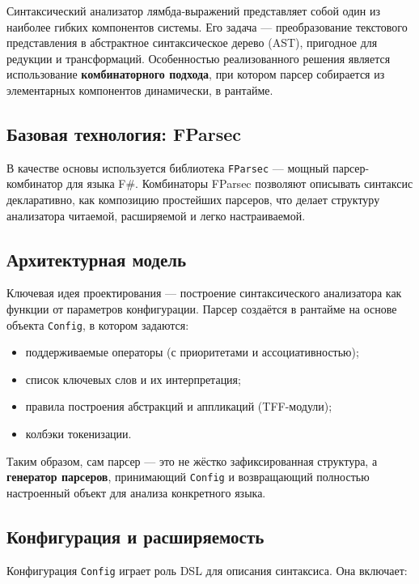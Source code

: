 Синтаксический анализатор лямбда‑выражений представляет собой один из наиболее гибких компонентов системы. Его задача — преобразование текстового представления в абстрактное синтаксическое дерево (AST), пригодное для редукции и трансформаций. Особенностью реализованного решения является использование \textbf{комбинаторного подхода}, при котором парсер собирается из элементарных компонентов динамически, в рантайме.

\subsection{Базовая технология: FParsec}

В качестве основы используется библиотека \texttt{FParsec} — мощный парсер-комбинатор для языка F\#. Комбинаторы FParsec позволяют описывать синтаксис декларативно, как композицию простейших парсеров, что делает структуру анализатора читаемой, расширяемой и легко настраиваемой.

\subsection{Архитектурная модель}

Ключевая идея проектирования — построение синтаксического анализатора как функции от параметров конфигурации. Парсер создаётся в рантайме на основе объекта \texttt{Config}, в котором задаются:

\begin{itemize}
  \item поддерживаемые операторы (с приоритетами и ассоциативностью);
  \item список ключевых слов и их интерпретация;
  \item правила построения абстракций и аппликаций (TFF-модули);
  \item колбэки токенизации.
\end{itemize}

Таким образом, сам парсер — это не жёстко зафиксированная структура, а \textbf{генератор парсеров}, принимающий \texttt{Config} и возвращающий полностью настроенный объект для анализа конкретного языка.

\subsection{Конфигурация и расширяемость}

Конфигурация \texttt{Config} играет роль DSL для описания синтаксиса. Она включает:

